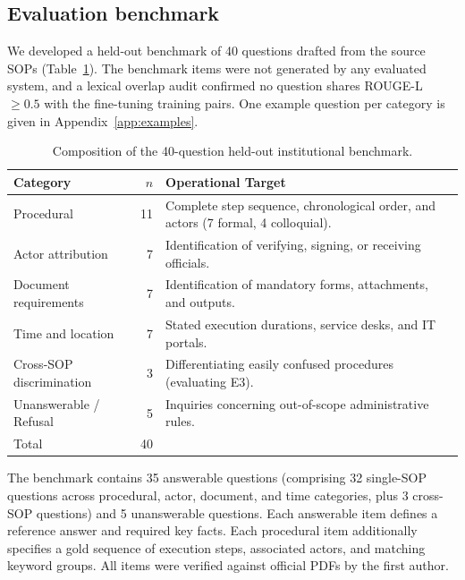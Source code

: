 \documentclass[preprint,10pt]{elsarticle}
\begin{document}
\subsection{Evaluation benchmark}
We developed a held-out benchmark of 40 questions drafted from the source SOPs (Table~\ref{tab:bench}). The benchmark items were not generated by any evaluated system, and a lexical overlap audit confirmed no question shares ROUGE-L $\geq 0.5$ with the fine-tuning training pairs. One example question per category is given in Appendix~\ref{app:examples}.

\begin{table}[!htbp]
\centering
\caption{Composition of the 40-question held-out institutional benchmark.}
\label{tab:bench}
\small
\setlength{\tabcolsep}{4pt}
\begin{tabularx}{\textwidth}{lr>{\raggedright\arraybackslash}X}
\toprule
Category & $n$ & Operational Target \\
\midrule
Procedural & 11 & Complete step sequence, chronological order, and actors (7 formal, 4 colloquial). \\
Actor attribution & 7 & Identification of verifying, signing, or receiving officials. \\
Document requirements & 7 & Identification of mandatory forms, attachments, and outputs. \\
Time and location & 7 & Stated execution durations, service desks, and IT portals. \\
Cross-SOP discrimination & 3 & Differentiating easily confused procedures (evaluating E3). \\
Unanswerable / Refusal & 5 & Inquiries concerning out-of-scope administrative rules. \\
\midrule
Total & 40 & \\
\bottomrule
\end{tabularx}
\end{table}

The benchmark contains 35 answerable questions (comprising 32 single-SOP questions across procedural, actor, document, and time categories, plus 3 cross-SOP questions) and 5 unanswerable questions. Each answerable item defines a reference answer and required key facts. Each procedural item additionally specifies a gold sequence of execution steps, associated actors, and matching keyword groups. All items were verified against official PDFs by the first author.
\end{document}
